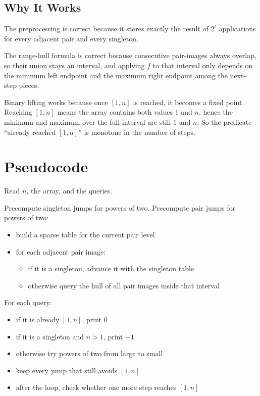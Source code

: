 \subsection{Why It Works}
The preprocessing is correct because it stores exactly the result of \(2^t\) applications for every adjacent pair and every singleton.

The range-hull formula is correct because consecutive pair-images always overlap, so their union stays an interval, and applying \(f\) to that interval only depends on the minimum left endpoint and the maximum right endpoint among the next-step pieces.

Binary lifting works because once \([1,n]\) is reached, it becomes a fixed point. Reaching \([1,n]\) means the array contains both values \(1\) and \(n\), hence the minimum and maximum over the full interval are still \(1\) and \(n\). So the predicate ``already reached \([1,n]\)'' is monotone in the number of steps.

\section{Pseudocode}
Read \(n\), the array, and the queries.

Precompute singleton jumps for powers of two.
Precompute pair jumps for powers of two:
\begin{itemize}
\item build a sparse table for the current pair level
\item for each adjacent pair image:
  \begin{itemize}
  \item if it is a singleton, advance it with the singleton table
  \item otherwise query the hull of all pair images inside that interval
  \end{itemize}
\end{itemize}

For each query:
\begin{itemize}
\item if it is already \([1,n]\), print \(0\)
\item if it is a singleton and \(n > 1\), print \(-1\)
\item otherwise try powers of two from large to small
\item keep every jump that still avoids \([1,n]\)
\item after the loop, check whether one more step reaches \([1,n]\)
\end{itemize}


